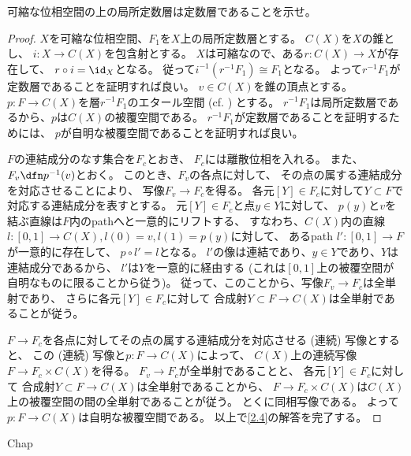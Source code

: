 \documentclass[uplatex,dvipdfmx]{jsarticle}
\begin{document}
\maketitle
\HeaderCommentA
\section{}
\fi


\begin{prob}\label{2.4}
  可縮な位相空間の上の局所定数層は定数層であることを示せ。
\end{prob}

\begin{proof}
  \(X\)を可縮な位相空間、\(F_1\)を\(X\)上の局所定数層とする。
  \(C(X)\)を\(X\)の錐とし、
  \(i:X\to C(X)\)を包含射とする。
  \(X\)は可縮なので、ある\(r:C(X)\to X\)が存在して、
  \(r\circ i = \id_X\)となる。
  従って\(i^{-1}(r^{-1}F_1) \cong F_1\)となる。
  よって\(r^{-1}F_1\)が定数層であることを証明すれば良い。
  \(v\in C(X)\)を錐の頂点とする。
  \(p:F\to C(X)\)を層\(r^{-1}F_1\)のエタール空間
  (cf. \cite[Exercise 1.13]{hartshorne2013algebraic}) とする。
  \(r^{-1}F_1\)は局所定数層であるから、\(p\)は\(C(X)\)の被覆空間である。
  \(r^{-1}F_1\)が定数層であることを証明するためには、
  \(p\)が自明な被覆空間であることを証明すれば良い。

  \(F\)の連結成分のなす集合を\(F_c\)とおき、
  \(F_c\)には離散位相を入れる。
  また、\(F_v\dfn p^{-1}(v)\)とおく。
  このとき、\(F_v\)の各点に対して、
  その点の属する連結成分を対応させることにより、
  写像\(F_v\to F_c\)を得る。
  各元\([Y]\in F_c\)に対して\(Y\subset F\)で対応する連結成分を表すとする。
  元\([Y]\in F_c\)と点\(y\in Y\)に対して、
  \(p(y)\)と\(v\)を結ぶ直線は\(F\)内のpathへと一意的にリフトする、
  すなわち、\(C(X)\)内の直線
  \(l:[0,1]\to C(X), l(0)=v,l(1)=p(y)\)に対して、
  あるpath \(l':[0,1]\to F\)が一意的に存在して、
  \(p\circ l' = l\)となる。
  \(l'\)の像は連結であり、\(y\in Y\)であり、\(Y\)は連結成分であるから、
  \(l'\)は\(Y\)を一意的に経由する
  (これは\([0,1]\)上の被覆空間が自明なものに限ることから従う)。
  従って、このことから、写像\(F_v\to F_c\)は全単射であり、
  さらに各元\([Y]\in F_c\)に対して
  合成射\(Y\subset F\to C(X)\)は全単射であることが従う。

  \(F\to F_c\)を各点に対してその点の属する連結成分を対応させる (連続) 写像とすると、
  この (連続) 写像と\(p:F\to C(X)\)によって、
  \(C(X)\)上の連続写像\(F\to F_c\times C(X)\)を得る。
  \(F_v\to F_c\)が全単射であることと、
  各元\([Y]\in F_c\)に対して
  合成射\(Y\subset F\to C(X)\)は全単射であることから、
  \(F\to F_c\times C(X)\)は\(C(X)\)上の被覆空間の間の全単射であることが従う。
  とくに同相写像である。
  よって\(p:F\to C(X)\)は自明な被覆空間である。
  以上で\autoref{2.4}の解答を完了する。
\end{proof}




\ifcsname Chap\endcsname\else
\printbibliography
\end{document}
